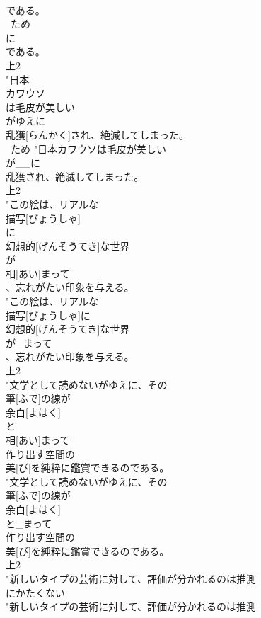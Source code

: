 \documentclass[8pt]{extreport}
\begin{document}
\begin{CJK}{UTF8}{min}
\\	である。
\\	~ため	
\\	に
\\	である。
\\	上2
\\	"日本
\\	カワウソ
\\	は毛皮が美しい
\\	がゆえに
\\	乱獲[らんかく]され、絶滅してしまった。
\\	~ため	"日本カワウソは毛皮が美しい
\\	が__に
\\	乱獲され、絶滅してしまった。
\\	上2
\\	"この絵は、リアルな
\\	描写[びょうしゃ]
\\	に
\\	幻想的[げんそうてき]な世界
\\	が
\\	相[あい]まって
\\	、忘れがたい印象を与える。
\\	"この絵は、リアルな
\\	描写[びょうしゃ]に
\\	幻想的[げんそうてき]な世界
\\	が_まって
\\	、忘れがたい印象を与える。
\\	上2
\\	"文学として読めないがゆえに、その
\\	筆[ふで]の線が
\\	余白[よはく]
\\	と
\\	相[あい]まって
\\	作り出す空間の
\\	美[び]を純粋に鑑賞できるのである。
\\	"文学として読めないがゆえに、その
\\	筆[ふで]の線が
\\	余白[よはく]
\\	と_まって
\\	作り出す空間の
\\	美[び]を純粋に鑑賞できるのである。
\\	上2
\\	"新しいタイプの芸術に対して、評価が分かれるのは推測
\\	にかたくない
\\	"新しいタイプの芸術に対して、評価が分かれるのは推測

\end{CJK}
\end{document}
